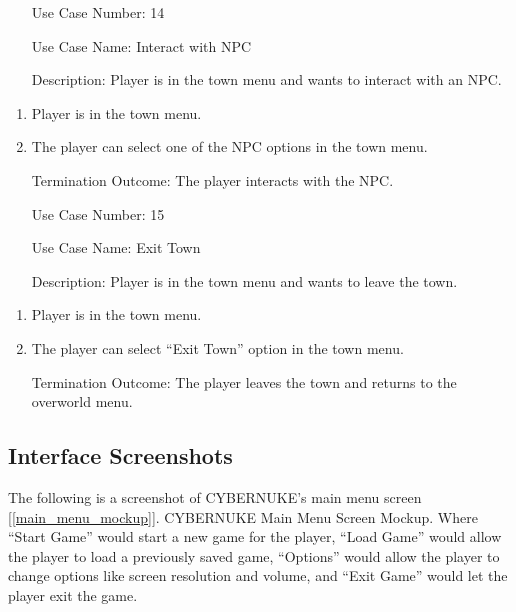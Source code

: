 \documentclass[10pt,conference,onecolumn,compsoc]{IEEEtran}
\begin{document}
\begin{itemize}
\item[Use Case Number:] 14
\item[Use Case Name:] Interact with NPC
\item[Description:] Player is in the town menu and wants to interact with an NPC.
\end{itemize}
\begin{enumerate}
\item Player is in the town menu.
\item The player can select one of the NPC options in the town menu.
\item [Termination Outcome:] The player interacts with the NPC.
\end{enumerate}

\begin{itemize}
\item[Use Case Number:] 15
\item[Use Case Name:] Exit Town
\item[Description:] Player is in the town menu and wants to leave the town.
\end{itemize}
\begin{enumerate}
\item Player is in the town menu.
\item The player can select “Exit Town” option in the town menu.
\item [Termination Outcome:] The player leaves the town and returns to the overworld menu.
\end{enumerate}

\pagebreak
\subsection{Interface Screenshots}

The following is a screenshot of CYBERNUKE's main menu screen [\ref{main_menu_mockup}].
CYBERNUKE Main Menu Screen Mockup. Where “Start Game” would start a new game for the player, “Load Game” would allow the player to load a previously saved game, “Options” would allow the player to change options like screen resolution and volume, and “Exit Game” would let the player exit the game.
\end{document}
